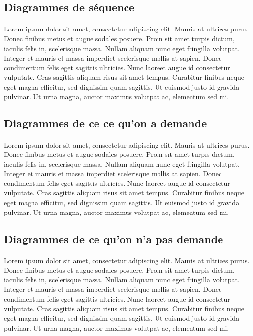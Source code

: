 \subsection{Diagrammes de séquence}
\paragraph{} 
Lorem ipsum dolor sit amet, consectetur adipiscing elit. Mauris at ultrices purus. Donec finibus metus et augue sodales posuere. Proin sit amet turpis dictum, iaculis felis in, scelerisque massa. Nullam aliquam nunc eget fringilla volutpat. Integer et mauris et massa imperdiet scelerisque mollis at sapien. Donec condimentum felis eget sagittis ultricies. Nunc laoreet augue id consectetur vulputate. Cras sagittis aliquam risus sit amet tempus. Curabitur finibus neque eget magna efficitur, sed dignissim quam sagittis. Ut euismod justo id gravida pulvinar. Ut urna magna, auctor maximus volutpat ac, elementum sed mi.
\subsection{Diagrammes de ce ce qu'on a demande}
\paragraph{} 
Lorem ipsum dolor sit amet, consectetur adipiscing elit. Mauris at ultrices purus. Donec finibus metus et augue sodales posuere. Proin sit amet turpis dictum, iaculis felis in, scelerisque massa. Nullam aliquam nunc eget fringilla volutpat. Integer et mauris et massa imperdiet scelerisque mollis at sapien. Donec condimentum felis eget sagittis ultricies. Nunc laoreet augue id consectetur vulputate. Cras sagittis aliquam risus sit amet tempus. Curabitur finibus neque eget magna efficitur, sed dignissim quam sagittis. Ut euismod justo id gravida pulvinar. Ut urna magna, auctor maximus volutpat ac, elementum sed mi.
\subsection{Diagrammes de ce qu'on n'a pas demande}
\paragraph{} 
Lorem ipsum dolor sit amet, consectetur adipiscing elit. Mauris at ultrices purus. Donec finibus metus et augue sodales posuere. Proin sit amet turpis dictum, iaculis felis in, scelerisque massa. Nullam aliquam nunc eget fringilla volutpat. Integer et mauris et massa imperdiet scelerisque mollis at sapien. Donec condimentum felis eget sagittis ultricies. Nunc laoreet augue id consectetur vulputate. Cras sagittis aliquam risus sit amet tempus. Curabitur finibus neque eget magna efficitur, sed dignissim quam sagittis. Ut euismod justo id gravida pulvinar. Ut urna magna, auctor maximus volutpat ac, elementum sed mi.
